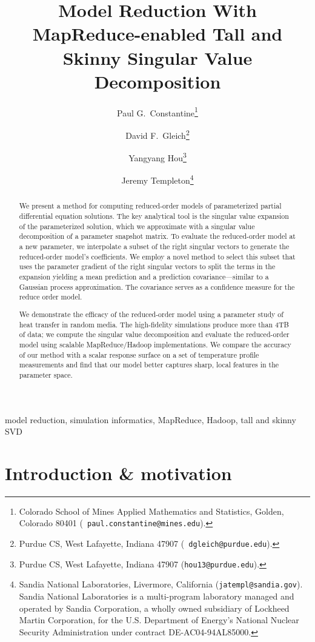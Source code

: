 \documentclass[final]{siamltex}
\title{Model Reduction With MapReduce-enabled Tall and Skinny
  Singular Value Decomposition}
\author{ Paul G.~Constantine\thanks{Colorado School of Mines Applied
    Mathematics and Statistics, Golden, Colorado 80401 ({\tt
      paul.constantine@mines.edu}).}  \and David
  F.~Gleich\thanks{Purdue CS, West Lafayette, Indiana 47907 ({\tt
      dgleich@purdue.edu}).}  \and Yangyang Hou\thanks{Purdue CS, West
    Lafayette, Indiana 47907 ({\tt hou13@purdue.edu}).}  \and \newline Jeremy
  Templeton\thanks{Sandia National Laboratories, Livermore, California
    ({\tt jatempl@sandia.gov}). Sandia National Laboratories is a
    multi-program laboratory managed and operated by Sandia
    Corporation, a wholly owned subsidiary of Lockheed Martin
    Corporation, for the U.S. Department of Energy's National Nuclear
    Security Administration under contract DE-AC04-94AL85000.}  }
\begin{document}
\maketitle

\begin{abstract}
We present a method for computing reduced-order models of
parameterized partial differential equation solutions. The key
analytical tool is the singular value expansion of the parameterized
solution, which we approximate with a singular value decomposition of
a parameter snapshot matrix. To evaluate the reduced-order model at a
new parameter, we interpolate a subset of the right singular vectors
to generate the reduced-order model's coefficients. We employ a novel
method to select this subset that uses the parameter gradient of the
right singular vectors to split the terms in the expansion yielding a
mean prediction and a prediction covariance---similar to a Gaussian
process approximation. The covariance serves as a confidence measure
for the reduce order model.
 
We demonstrate the efficacy of the reduced-order model using a
parameter study of heat transfer in random media. The high-fidelity
simulations produce more than 4TB of data; we compute the singular
value decomposition and evaluate the reduced-order model using
scalable MapReduce/Hadoop implementations.  We compare the accuracy of
our method with a scalar response surface on a set of temperature
profile measurements and find that our model better captures sharp,
local features in the parameter space.
\end{abstract}

\begin{keywords} 
model reduction, simulation informatics, MapReduce, Hadoop, tall and
skinny SVD
\end{keywords}

\pagestyle{myheadings}
\thispagestyle{plain}

\section{Introduction \& motivation}
\label{sec:intro}
\end{document}
